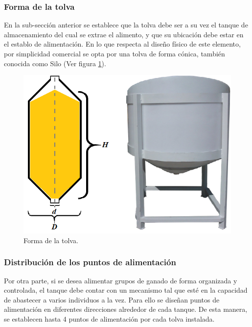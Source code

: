 \subsubsection{Forma de la tolva}

En la sub-sección anterior se establece que la tolva debe ser a su vez el tanque de almacenamiento del cual se extrae el alimento, y que su ubicación debe estar en el establo de alimentación. En lo que respecta al diseño físico de este elemento, por simplicidad comercial  se opta por una tolva de forma cónica, también conocida como Silo (Ver figura \ref{tolvapng}).

\begin{figure}[H]
	\begin{center}
		\includegraphics[scale=0.50]{img/tolvas.png}
	\end{center}
	\caption{Forma de la tolva. \label{tolvapng}}
\end{figure}

\subsubsection{Distribución de los puntos de alimentación}
Por otra parte, si se desea alimentar grupos de ganado de forma organizada y controlada, el tanque debe contar con un mecanismo tal que esté en la capacidad de abastecer a varios individuos a la vez. Para ello se diseñan puntos de alimentación en diferentes direcciones alrededor de cada tanque. De esta manera, 
se establecen hasta 4 puntos de alimentación por cada tolva instalada.
 
